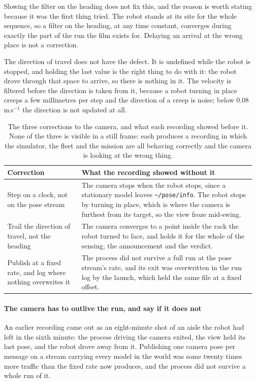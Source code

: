\documentclass[11pt,a4paper]{article}
\theoremstyle{definition}
\newcommand{\code}[1]{\texttt{\small #1}}
\begin{document}
Slowing the filter on the heading does not fix this, and the reason is worth
stating because it was the first thing tried. The robot stands at its site for
the whole sequence, so a filter on the heading, at any time constant, converges
during exactly the part of the run the film exists for. Delaying an arrival at
the wrong place is not a correction.

The direction of travel does not have the defect. It is undefined while the
robot is stopped, and holding the last value is the right thing to do with it:
the robot drove through that space to arrive, so there is nothing in it. The
velocity is filtered before the direction is taken from it, because a robot
turning in place creeps a few millimetres per step and the direction of a creep
is noise; below $0.08$\,m\,s$^{-1}$ the direction is not updated at all.

\begin{table}[H]
\centering\small
\caption{The three corrections to the camera, and what each recording showed
before it. None of the three is visible in a still frame: each produces a
recording in which the simulator, the fleet and the mission are all behaving
correctly and the camera is looking at the wrong thing.}
\label{tab:camera}
\begin{tabularx}{\textwidth}{@{}p{}X@{}}
\toprule
\textbf{Correction} & \textbf{What the recording showed without it} \\
\midrule
Step on a clock, not on the pose stream &
The camera stops when the robot stops, since a stationary model leaves
\code{\textasciitilde/pose/info}. The robot stops by turning in place, which is
where the camera is furthest from its target, so the view froze mid-swing. \\
\addlinespace
Trail the direction of travel, not the heading &
The camera converges to a point inside the rack the robot turned to face, and
holds it for the whole of the sensing, the announcement and the verdict. \\
\addlinespace
Publish at a fixed rate, and log where nothing overwrites it &
The process did not survive a full run at the pose stream's rate, and its exit
was overwritten in the run log by the launch, which held the same file at a
fixed offset. \\
\bottomrule
\end{tabularx}
\end{table}

\paragraph{The camera has to outlive the run, and say if it does not} An
earlier recording came out as an eight-minute shot of an aisle the robot had
left in the sixth minute: the process driving the camera exited, the view held
its last pose, and the robot drove away from it. Publishing one camera pose per
message on a stream carrying every model in the world was some twenty times
more traffic than the fixed rate now produces, and the process did not survive
a whole run of it.
\end{document}
